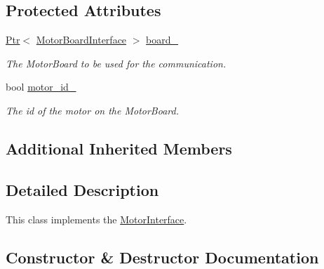 \subsection*{Protected Attributes}
\begin{DoxyCompactItemize}
\item 
\mbox{\label{classblmc__drivers_1_1Motor_a779365c022edb7d4beb4060dcdb7dd72}} 
\hyperlink{classblmc__drivers_1_1MotorInterface_ae31f230b9da3674a05543023c90b124c}{Ptr}$<$ \hyperlink{classblmc__drivers_1_1MotorBoardInterface}{Motor\+Board\+Interface} $>$ \hyperlink{classblmc__drivers_1_1Motor_a779365c022edb7d4beb4060dcdb7dd72}{board\+\_\+}
\begin{DoxyCompactList}\small\item\em The Motor\+Board to be used for the communication. \end{DoxyCompactList}\item 
\mbox{\label{classblmc__drivers_1_1Motor_a614903579bd6001169d11b72bc17042b}} 
bool \hyperlink{classblmc__drivers_1_1Motor_a614903579bd6001169d11b72bc17042b}{motor\+\_\+id\+\_\+}
\begin{DoxyCompactList}\small\item\em The id of the motor on the Motor\+Board. \end{DoxyCompactList}\end{DoxyCompactItemize}
\subsection*{Additional Inherited Members}


\subsection{Detailed Description}
This class implements the \hyperlink{classblmc__drivers_1_1MotorInterface}{Motor\+Interface}. 

\subsection{Constructor \& Destructor Documentation}
\mbox{\label{classblmc__drivers_1_1Motor_a923be3c8e5027cdead1006f3878b6ec3}} 

